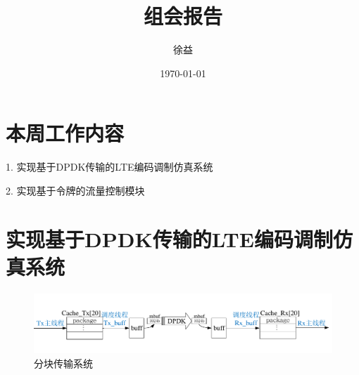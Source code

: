 \documentclass{article}
\title{组会报告}
\author{徐益}
\date{\today}
\begin{document}
	
\maketitle


\section{本周工作内容}

1. 实现基于DPDK传输的LTE编码调制仿真系统

2. 实现基于令牌的流量控制模块

\section{实现基于DPDK传输的LTE编码调制仿真系统}
\begin{figure}[H]
	\centering
	\includegraphics[width = \textwidth]{frame_sys.pdf}
	\caption{分块传输系统}
\end{figure}
\end{document}
